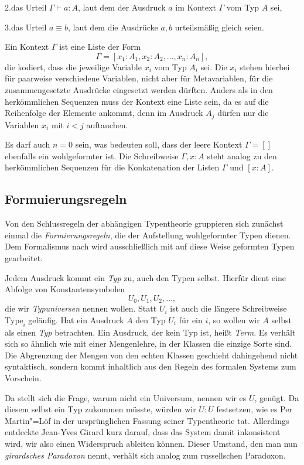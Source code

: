 2.\;das Urteil $\Gamma\vdash a\colon A$, laut dem der Ausdruck
$a$ im Kontext $\Gamma$ vom Typ $A$ sei,

3.\;das Urteil $a\equiv b$, laut dem die Ausdrücke
$a,b$ urteilsmäßig gleich seien.

Ein Kontext $\Gamma$ ist eine Liste der Form
\[\Gamma = [x_1\colon A_1,x_2\colon A_2,\ldots,x_n\colon A_n],\]
die kodiert, dass die jeweilige Variable $x_i$ vom Typ $A_i$ sei. Die $x_i$
stehen hierbei für paarweise verschiedene Variablen, nicht aber für
Metavariablen, für die zusammengesetzte Ausdrücke eingesetzt werden
dürften. Anders als in den herkömmlichen Sequenzen muss der Kontext
eine Liste sein, da es auf die Reihenfolge der Elemente ankommt, denn
im Ausdruck $A_j$ dürfen nur die Variablen $x_i$ mit $i<j$ auftauchen.

Es darf auch $n=0$ sein, was bedeuten soll, dass der leere Kontext
$\Gamma=[]$ ebenfalls ein wohlgeformter ist. Die Schreibweise
$\Gamma,x\colon A$ steht analog zu den herkömmlichen Sequenzen für die
Konkatenation der Listen $\Gamma$ und $[x\colon A]$.

\subsection{Formuierungsregeln}

Von den Schlussregeln der abhängigen Typentheorie gruppieren sich
zunächst einmal die \emph{Formierungsregeln}, die der Aufstellung
wohlgeformter Typen dienen. Dem Formalismus nach wird ausschließlich
mit auf diese Weise geformten Typen gearbeitet.

Jedem Ausdruck kommt ein \emph{Typ} zu, auch den Typen selbst. Hierfür
dient eine Abfolge von Konstantensymbolen
\[U_0,U_1,U_2,\ldots,\]
die wir \emph{Typuniversen}
nennen wollen. Statt $U_i$ ist auch die längere Schreibweise $\mathrm{Type}_i$
geläufig. Hat ein Ausdruck $A$ den Typ $U_i$ für ein $i$, so wollen wir $A$
selbst als einen \emph{Typ} betrachten. Ein Ausdruck, der kein Typ ist,
heißt \emph{Term}. Es verhält sich so ähnlich wie mit einer Mengenlehre,
in der Klassen die einzige Sorte sind. Die Abgrenzung der Mengen von den
echten Klassen geschieht dahingehend nicht syntaktisch, sondern kommt
inhaltlich aus den Regeln des formalen Systems zum Vorschein.

Da stellt sich die Frage, warum nicht ein Universum, nennen wir es $U$,
genügt. Da diesem selbst ein Typ zukommen müsste, würden wir $U\colon U$
festsetzen, wie es Per Martin"=Löf
in der ursprünglichen Fassung seiner Typentheorie tat. Allerdings entdeckte
Jean-Yves Girard kurz darauf, dass
das System damit inkonsistent wird, wir also einen Widerspruch ableiten
können. Dieser Umstand, den man nun \emph{girardsches Paradoxon}%
 nennt, verhält sich analog zum russellschen
Paradoxon. \cite{Coquand-Type-Theory}

